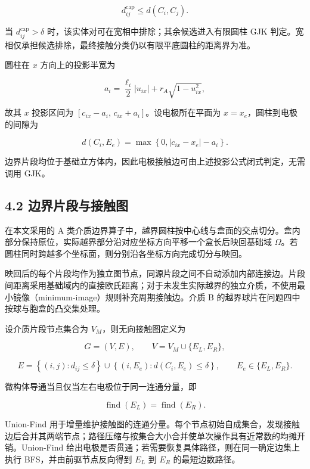 \[
d_{ij}^{\mathrm{cap}}\leq d(C_i,C_j).
\]

当 \(d_{ij}^{\mathrm{cap}}>\delta\) 时，该实体对可在宽相中排除；其余候选进入有限圆柱 GJK 判定。宽相仅承担候选排除，最终接触分类仍以有限平底圆柱的距离界为准。

圆柱在 \(x\) 方向上的投影半宽为

\[
a_i=\frac{\ell_i}{2}|u_{ix}|+r_A\sqrt{1-u_{ix}^{2}},
\]

故其 \(x\) 投影区间为 \([c_{ix}-a_i,\,c_{ix}+a_i]\)。设电极所在平面为 \(x=x_e\)，圆柱到电极的间隙为

\[
d(C_i,E_e)=\max\left\{0,|c_{ix}-x_e|-a_i\right\}.
\]

边界片段均位于基础立方体内，因此电极接触边可由上述投影公式闭式判定，无需调用 GJK。

\subsection{4.2 边界片段与接触图}\label{ux8fb9ux754cux7247ux6bb5ux4e0eux63a5ux89e6ux56fe}

在本文采用的 A 类介质边界算子中，越界圆柱按中心线与盒面的交点切分。盒内部分保持原位，实际越界部分沿对应坐标方向平移一个盒长后映回基础域 \(\Omega\)。若圆柱同时跨越多个坐标面，则分别沿各坐标方向完成切分与映回。

映回后的每个片段均作为独立图节点，同源片段之间不自动添加内部连接边。片段间距离采用基础域内的直接欧氏距离；对于未发生实际越界的独立介质，不使用最小镜像（minimum-image）规则补充周期接触边。介质 B 的越界球片在问题四中按球与胞盒的凸交集处理。

设介质片段节点集合为 \(V_M\)，则无向接触图定义为

\[
G=(V,E),\qquad V=V_M\cup\{E_L,E_R\},
\]

\[
E=\left\{(i,j):d_{ij}\leq\delta\right\}
\cup
\left\{(i,E_e):d(C_i,E_e)\leq\delta\right\},
\qquad E_e\in\{E_L,E_R\}.
\]

微构体导通当且仅当左右电极位于同一连通分量，即

\[
\operatorname{find}(E_L)=\operatorname{find}(E_R).
\]

Union-Find 用于增量维护接触图的连通分量。每个节点初始自成集合，发现接触边后合并其两端节点；路径压缩与按集合大小合并使单次操作具有近常数的均摊开销。Union-Find 给出电极是否贯通；若需要恢复具体路径，则在同一确定边集上执行 BFS，并由前驱节点反向得到 \(E_L\) 到 \(E_R\) 的最短边数路径。

